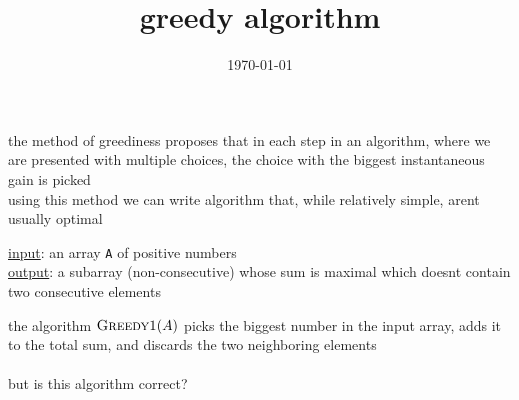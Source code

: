\documentclass[11pt]{article}
\date{\today}
\title{greedy algorithm}
\begin{document}
\maketitle
\tableofcontents

the method of greediness proposes that in each step in an algorithm, where we are presented with multiple choices, the choice with the biggest instantaneous gain is picked\\
using this method we can write algorithm that, while relatively simple, arent usually optimal\\
\begin{question}
\uline{input}: an array \texttt{A} of positive numbers\\
\uline{output}: a subarray (non-consecutive) whose sum is maximal which doesnt contain two consecutive elements\\
\begin{answer}
the algorithm \(\textsc{Greedy1}(A)\) picks the biggest number in the input array, adds it to the total sum, and discards the two neighboring elements\\
\\

but is this algorithm correct?\\
\end{answer}
\end{question}
\end{document}
